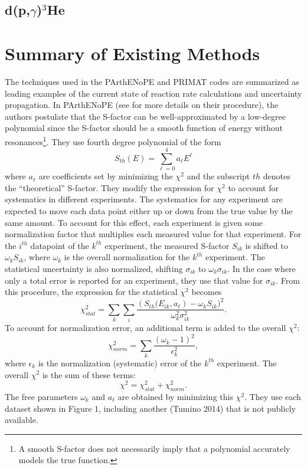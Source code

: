 \documentclass[%
 reprint,
superscriptaddress,
nofootinbib,
 amsmath,amssymb,
 aps,
 pra,
]{revtex4-2}
\begin{document}
\subsection{d(p,$\gamma$)$^3$He}



\section{Summary of Existing Methods}



The techniques used in the PArthENoPE and PRIMAT codes are summarized as leading examples of the current state of reaction rate calculations and uncertainty propagation. In PArthENoPE (see \cite{Pisanti2021} for more details on their procedure), the authors postulate that the S-factor can be well-approximated by a low-degree polynomial since the S-factor should be a smooth function of energy without resonances\footnote{A smooth S-factor does not necessarily imply that a polynomial accurately models the true function.}. They use fourth degree polynomial of the form 
\begin{equation}
	S_{th}(E) = \sum_{\ell=0}^4 a_\ell E^\ell \nonumber
\end{equation}
where $a_\ell$ are coefficients set by minimizing the $\chi^2$ and the subscript $th$ denotes the “theoretical” S-factor. They modify the expression for $\chi^2$ to account for systematics in different experiments. The systematics for any experiment are expected to move each data point either up or down from the true value by the same amount. To account for this effect, each experiment is given some normalization factor that multiplies each measured value for that experiment. For the $i^{th}$ datapoint of the $k^{th}$ experiment, the measured S-factor $S_{ik}$ is shifted to $\omega_k S_{ik}$, where $\omega_k$ is the overall normalization for the $k^{th}$ experiment. The statistical uncertainty is also normalized, shifting $\sigma_{ik}$ to $\omega_k \sigma_{ik}$. In the case where only a total error is reported for an experiment, they use that value for $\sigma_{ik}$. From this procedure, the expression for the statistical $\chi^2$ becomes 
\begin{equation}
	\chi^2_{stat} = \sum_k \sum_i \frac{\left(S_{th}(E_{ik}, a_\ell \right) - \omega_k S_{ik} )^2}{\omega_k^2 \sigma_{ik}^2}. \nonumber
\end{equation}
To account for normalization error, an additional term is added to the overall $\chi^2$:
\begin{equation}
	\chi^2_{norm} = \sum_k \frac{\left( \omega_k - 1 \right)^2}{\epsilon_k^2}, \nonumber
\end{equation}
where $\epsilon_k$ is the normalization (systematic) error of the $k^{th}$ experiment. The overall $\chi^2$ is the sum of these terms:
\begin{equation}
	\chi^2 = \chi^2_{stat} + \chi^2_{norm}. \nonumber
\end{equation}
The free parameters $\omega_k$ and $a_\ell$ are obtained by minimizing this $\chi^2$. They use each dataset shown in Figure 1, including another (Tumino 2014) that is not publicly available. 
\end{document}
